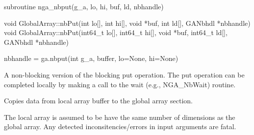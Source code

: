 \documentclass[10pt]{article}
\begin{document}
\begin{fapi}
\begin{fcode}
subroutine nga_nbput(g_a, lo, hi, buf, ld, nbhandle)
\end{fcode}
\begin{funcargs}
\end{funcargs}
\end{fapi}

\begin{cxxapi}
\begin{cxxcode}
void GlobalArray::nbPut(int lo[], int hi[],
                        void *buf, int ld[], GANbhdl *nbhandle)
void GlobalArray::nbPut(int64_t lo[], int64_t hi[],
                        void *buf, int64_t ld[], GANbhdl *nbhandle)
\end{cxxcode}
\begin{funcargs}
\end{funcargs}
\end{cxxapi}

\begin{pyapi}
\begin{pycode}
nbhandle = ga.nbput(int g_a, buffer, lo=None, hi=None)
\end{pycode}
\begin{funcargs}
\end{funcargs}
\end{pyapi}

\ncoll

\begin{desc}
A non-blocking version of the blocking put operation. The put operation can be
completed locally by making a call to the wait (e.g., NGA_NbWait) routine.

Copies data from local array buffer to the global array section.

The local array is assumed to be have the same number of dimensions as the
global array. Any detected inconsitencies/errors in input arguments are fatal.
\end{desc}
\end{document}
